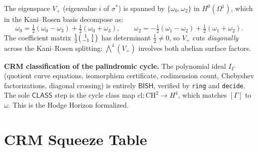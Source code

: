 \documentclass[11pt]{article}
\theoremstyle{plain}
\theoremstyle{definition}
\theoremstyle{remark}
\newcommand{\CH}{\mathrm{CH}}
\newcommand{\BISH}{\mathsf{BISH}}
\newcommand{\CLASS}{\mathsf{CLASS}}
\begin{document}
The eigenspace $V_+$ (eigenvalue $i$ of $\sigma^*$) is spanned by
$\{\omega_0, \omega_2\}$ in $H^0(\Omega^1)$, which in the
Kani--Rosen basis decompose as:
\[
  \omega_0 = \tfrac{1}{2}(\omega_0 - \omega_3)
           + \tfrac{1}{2}(\omega_0 + \omega_3),
  \qquad
  \omega_2 = -\tfrac{1}{2}(\omega_1 - \omega_2)
           + \tfrac{1}{2}(\omega_1 + \omega_2).
\]
The coefficient matrix $\frac{1}{2}\begin{psmallmatrix}1 & 1 \\
-1 & 1\end{psmallmatrix}$ has determinant $\frac{1}{2} \neq 0$,
so $V_+$ cuts \emph{diagonally} across the Kani--Rosen splitting:
$\bigwedge^4(V_+)$ involves both abelian surface factors.

\begin{crmbox}
\textbf{CRM classification of the palindromic cycle.}
The polynomial ideal $I_\Gamma$ (quotient curve equations,
isomorphism certificate, codimension count, Chebyshev factorizations,
diagonal crossing) is entirely $\BISH$, verified by \texttt{ring} and
\texttt{decide}.  The sole $\CLASS$ step is the cycle class map
$\mathrm{cl}: \CH^2 \to H^4$, which matches $[\Gamma]$ to $\omega$.
This is the Hodge Horizon formalized.
\end{crmbox}

\section{CRM Squeeze Table}\label{sec:squeeze}
\end{document}
